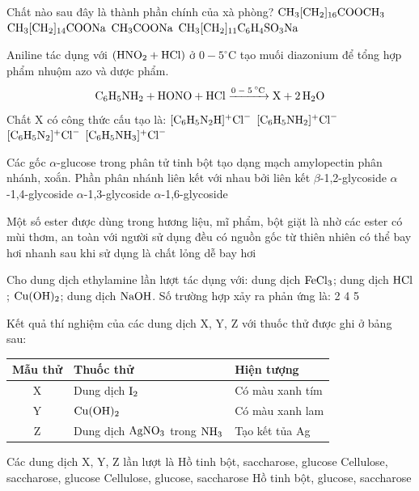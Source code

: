\documentclass[12pt,a4paper]{article}
\begin{document}
\begin{ex}
Chất nào sau đây là thành phần chính của xà phòng?
\choice
{$\ce{CH3[CH2]_{16}COOCH3}$}
{\True $\ce{CH3[CH2]_{14}COONa}$}
{$\ce{CH3COONa}$}
{$\ce{CH3[CH2]_{11}C6H4SO3Na}$}
\end{ex}

\begin{ex}
Aniline tác dụng với $(\ce{HNO2 + HCl})$ ở $0 - 5^\circ\text{C}$ tạo muối diazonium để tổng hợp phẩm nhuộm azo và dược phẩm.
\[\ce{C6H5NH2 + HONO + HCl ->[0 - 5^\circ\text{C}] X + 2H2O}\]
Chất X có công thức cấu tạo là:
\choice
{$[\ce{C6H5N2H}]^+\ce{Cl^-}$}
{$[\ce{C6H5NH2}]^+\ce{Cl^-}$}
{\True $[\ce{C6H5N2}]^+\ce{Cl^-}$}
{$[\ce{C6H5NH3}]^+\ce{Cl^-}$}
\end{ex}

\begin{ex}
Các gốc $\alpha$-glucose trong phân tử tinh bột tạo dạng mạch amylopectin phân nhánh, xoắn. Phần phân nhánh liên kết với nhau bởi liên kết
\choice
{$\beta$-1,2-glycoside}
{$\alpha$-1,4-glycoside}
{$\alpha$-1,3-glycoside}
{\True $\alpha$-1,6-glycoside}
\end{ex}

\begin{ex}
Một số ester được dùng trong hương liệu, mĩ phẩm, bột giặt là nhờ các ester
\choice
{\True có mùi thơm, an toàn với người sử dụng}
{đều có nguồn gốc từ thiên nhiên}
{có thể bay hơi nhanh sau khi sử dụng}
{là chất lỏng dễ bay hơi}
\end{ex}

\begin{ex}
Cho dung dịch ethylamine lần lượt tác dụng với: dung dịch $\ce{FeCl3}$; dung dịch $\ce{HCl}$; $\ce{Cu(OH)2}$; dung dịch $\ce{NaOH}$. Số trường hợp xảy ra phản ứng là:
\choice
{2}
{4}
{5}
{}
\end{ex}

\begin{ex}
Kết quả thí nghiệm của các dung dịch X, Y, Z với thuốc thử được ghi ở bảng sau:
\begin{center}
\begin{tabular}{|c|l|l|}
\hline
\textbf{Mẫu thử} & \textbf{Thuốc thử} & \textbf{Hiện tượng} \\ \hline
X & Dung dịch $\ce{I2}$ & Có màu xanh tím \\ \hline
Y & $\ce{Cu(OH)2}$ & Có màu xanh lam \\ \hline
Z & Dung dịch $\ce{AgNO3}$ trong $\ce{NH3}$ & Tạo kết tủa Ag \\ \hline
\end{tabular}
\end{center}
Các dung dịch X, Y, Z lần lượt là
\choice
{\True Hồ tinh bột, saccharose, glucose}
{Cellulose, saccharose, glucose}
{Cellulose, glucose, saccharose}
{Hồ tinh bột, glucose, saccharose}
\end{ex}
\end{document}
